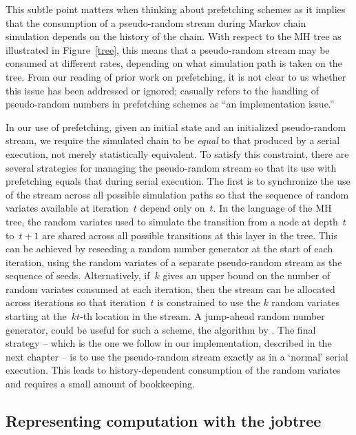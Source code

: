 \documentclass[angelino.tex]{subfiles}
\begin{document}
This subtle point matters when thinking about prefetching schemes
as it implies that the consumption of a pseudo-random stream during
Markov chain simulation depends on the history of the chain.
%
With respect to the MH tree as illustrated in Figure~\ref{tree},
this means that a pseudo-random stream may be consumed at different rates,
depending on what simulation path is taken on the tree.
%
From our reading of prior work on prefetching, it is not clear to us whether
this issue has been addressed or ignored;
\eg \citet{strid-2010-prefetching} casually refers to the handling of
pseudo-random numbers in prefetching schemes as ``an implementation issue.''

In our use of prefetching, given an initial state and an initialized
pseudo-random stream, we require the simulated chain to be \emph{equal} to that 
produced by a serial execution, not merely statistically equivalent.
%
To satisfy this constraint, there are several strategies for managing the
pseudo-random stream so that its use with prefetching equals that
during serial execution.
%
The first is to synchronize the use of the stream across all possible
simulation paths so that the sequence of random variates available at
iteration~$t$ depend only on~$t$.
%
In the language of the MH tree, the random variates used to simulate the
transition from a node at depth~$t$ to~${t+1}$ are shared across all
possible transitions at this layer in the tree.
%
This can be achieved by reseeding a random number generator at the
start of each iteration, \eg using the random variates of a separate
pseudo-random stream as the sequence of seeds.
%
Alternatively, if~$k$ gives an upper bound on the number of random variates
consumed at each iteration, then the stream can be allocated across iterations
so that iteration~$t$ is constrained to use the $k$ random variates starting at
the~$kt$-th location in the stream.
%
A jump-ahead random number generator, could be useful for such a scheme,
\eg the algorithm by \citet{haramoto:2008-jump-ahead,haramoto:2008-jump-rng}.
%
The final strategy -- which is the one we follow in our implementation,
described in the next chapter -- is to use the pseudo-random stream exactly as
in a `normal' serial execution.
%
This leads to history-dependent consumption of the random variates and requires
a small amount of bookkeeping.

\subsection{Representing computation with the jobtree}
\label{sec:jobtree}
\end{document}

